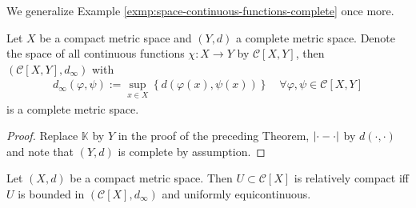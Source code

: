 We generalize Example \ref{exmp:space-continuous-functions-complete} once more.

\begin{theorem}
	Let $X$ be a compact metric space and $(Y, d)$ a complete metric space. Denote the space of all continuous functions $\chi: X\to Y$ by $\mathcal C[X, Y]$, then $(\mathcal C[X, Y], d_{\infty})$ with 
	\begin{align}
		d_{\infty}(\varphi, \psi) := \sup_{x\in X}\left\{ d(\varphi(x), \psi(x)) \right\} \quad \forall\varphi, \psi\in \mathcal C[X, Y]
	\end{align}
	is a complete metric space.
\end{theorem}

\begin{proof}
	Replace $\mathbb K$ by $Y$ in the proof of the preceding Theorem, $\left\vert \cdot - \cdot \right\vert$ by $d(\cdot, \cdot)$ and note that $(Y, d)$ is complete by assumption.
\end{proof}

\begin{theorem}\label{thrm:arzela-ascoli}
	Let $(X, d)$ be a compact metric space. Then $U\subset \mathcal C[X]$ is relatively compact iff $U$ is bounded in $(\mathcal C[X], d_{\infty})$ and uniformly equicontinuous.
\end{theorem}

